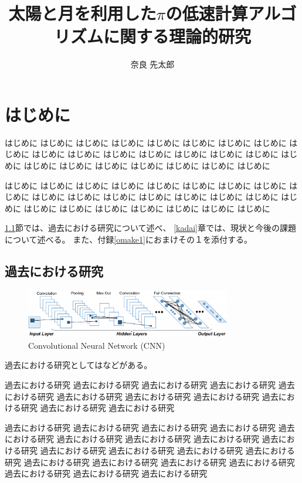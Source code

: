 \documentclass[12pt,dvipdfmx]{jarticle} %
\title{太陽と月を利用した$\pi$の低速計算アルゴリズムに関する理論的研究}
\author{奈良 先太郎}
\begin{document}
%
%
\titlepage
\cmemberspage
\firstabstract
\secondabstract
%
%
\toc
\newpage
\listoffigures
\listoftables
%
%
\newpage
\section{はじめに}

はじめに はじめに はじめに はじめに はじめに はじめに はじめに はじめに 
はじめに はじめに はじめに はじめに はじめに はじめに はじめに はじめに 
はじめに はじめに はじめに はじめに はじめに はじめに はじめに はじめに 

はじめに はじめに はじめに はじめに はじめに はじめに はじめに はじめに 
はじめに はじめに はじめに はじめに はじめに はじめに はじめに はじめに 
はじめに はじめに はじめに はじめに はじめに はじめに はじめに はじめに 

\ref{kako}節では、過去における研究について述べ、
\ref{kadai}章では、現状と今後の課題について述べる。
また、付録\ref{omake1}におまけその１を添付する。


\subsection{過去における研究}
\label{kako}


\begin{figure}[t]
 \centering
 \includegraphics[width=0.8\textwidth,keepaspectratio,clip]{fig/cnn}
 \caption{Convolutional Neural Network (CNN)}
 \label{fig:CNN}
\end{figure}

過去における研究としては\cite{alex_nips12}などがある。

過去における研究 過去における研究 過去における研究 
過去における研究 過去における研究 過去における研究 過去における研究 
過去における研究 過去における研究 過去における研究 過去における研究 

過去における研究 過去における研究 過去における研究 過去における研究 
過去における研究 過去における研究 過去における研究 過去における研究 
過去における研究 過去における研究 過去における研究 過去における研究 
過去における研究 過去における研究 過去における研究 過去における研究 
過去における研究 過去における研究 過去における研究 過去における研究 
\end{document}
